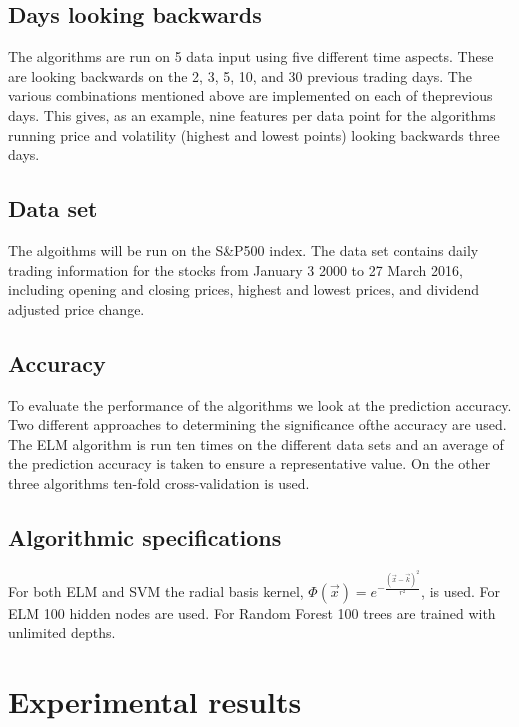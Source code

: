 \documentclass{article}
\begin{document}
\subsection{Days looking backwards}
The algorithms are run on 5 data input using five different time aspects. These are looking backwards on the 2, 3, 5, 10, and 30 previous trading days. The various combinations mentioned above are implemented on each of theprevious days. This gives, as an example, nine features per data point for the algorithms running price and volatility (highest and lowest points) looking backwards three days.

\subsection{Data set}
The algoithms will be run on the S\&P500 index. The data set contains daily trading information for the stocks from January 3 2000 to 27 March 2016, including opening and closing prices, highest and lowest prices, and dividend adjusted price change. 

\subsection{Accuracy} 
To evaluate the performance of the algorithms we look at the prediction accuracy. Two different approaches to determining the significance ofthe accuracy are used. The ELM algorithm is run ten times on the different data sets and an average of the prediction accuracy is taken to ensure a representative value. On the other three algorithms ten-fold cross-validation is used. 

\subsection{Algorithmic specifications}
For both ELM and SVM the radial basis kernel, $\Phi(\vec{x}) = e^{-\frac{(\vec{x} - \vec{k})^2}{r^2}}$, is used. For ELM 100 hidden nodes are used. For Random Forest 100 trees are trained with unlimited depths.

\newpage

\section{Experimental results}
\end{document}

